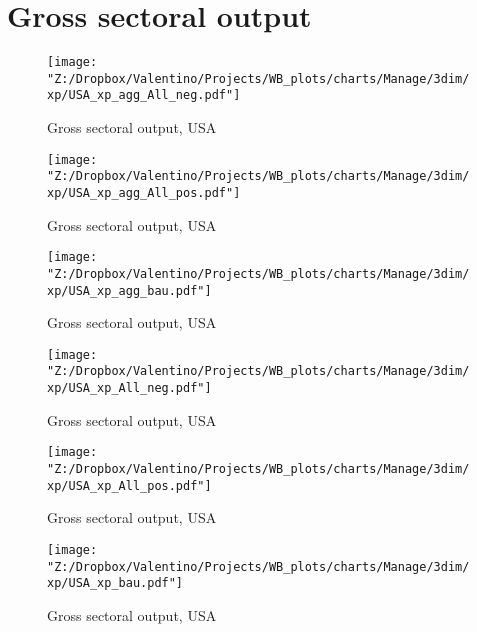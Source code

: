 \documentclass[12pt, letterpaper]{article}
\begin{document}
\newpage
\section{Gross sectoral output}
\begin{figure}[H]
\caption{Gross sectoral output, USA}
\label{fig_USA_xp_agg_All_neg}
\centering
\texttt{[image: "Z:/Dropbox/Valentino/Projects/WB\_plots/charts/Manage/3dim/xp/USA\_xp\_agg\_All\_neg.pdf"]}
\end{figure}
\begin{figure}[H]
\caption{Gross sectoral output, USA}
\label{fig_USA_xp_agg_All_pos}
\centering
\texttt{[image: "Z:/Dropbox/Valentino/Projects/WB\_plots/charts/Manage/3dim/xp/USA\_xp\_agg\_All\_pos.pdf"]}
\end{figure}
\begin{figure}[H]
\caption{Gross sectoral output, USA}
\label{fig_USA_xp_agg_bau}
\centering
\texttt{[image: "Z:/Dropbox/Valentino/Projects/WB\_plots/charts/Manage/3dim/xp/USA\_xp\_agg\_bau.pdf"]}
\end{figure}
\begin{figure}[H]
\caption{Gross sectoral output, USA}
\label{fig_USA_xp_All_neg}
\centering
\texttt{[image: "Z:/Dropbox/Valentino/Projects/WB\_plots/charts/Manage/3dim/xp/USA\_xp\_All\_neg.pdf"]}
\end{figure}
\begin{figure}[H]
\caption{Gross sectoral output, USA}
\label{fig_USA_xp_All_pos}
\centering
\texttt{[image: "Z:/Dropbox/Valentino/Projects/WB\_plots/charts/Manage/3dim/xp/USA\_xp\_All\_pos.pdf"]}
\end{figure}
\begin{figure}[H]
\caption{Gross sectoral output, USA}
\label{fig_USA_xp_bau}
\centering
\texttt{[image: "Z:/Dropbox/Valentino/Projects/WB\_plots/charts/Manage/3dim/xp/USA\_xp\_bau.pdf"]}
\end{figure}
\end{document}
